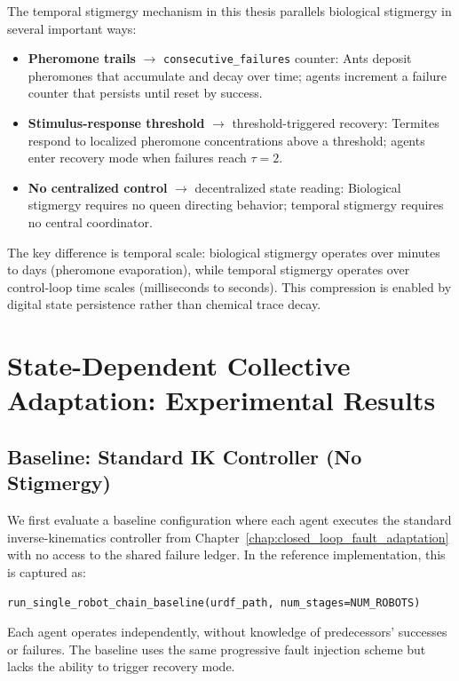 \documentclass[12pt,a4paper,oneside]{report}
\begin{document}
The temporal stigmergy mechanism in this thesis parallels biological stigmergy in several important ways:

\begin{itemize}
    \item \textbf{Pheromone trails} $\rightarrow$ \texttt{consecutive\_failures} counter: Ants deposit pheromones that accumulate and decay over time; agents increment a failure counter that persists until reset by success.
    \item \textbf{Stimulus-response threshold} $\rightarrow$ threshold-triggered recovery: Termites respond to localized pheromone concentrations above a threshold; agents enter recovery mode when failures reach $\tau = 2$.
    \item \textbf{No centralized control} $\rightarrow$ decentralized state reading: Biological stigmergy requires no queen directing behavior; temporal stigmergy requires no central coordinator.
\end{itemize}

The key difference is temporal scale: biological stigmergy operates over minutes to days (pheromone evaporation), while temporal stigmergy operates over control-loop time scales (milliseconds to seconds). This compression is enabled by digital state persistence rather than chemical trace decay.

\section{State-Dependent Collective Adaptation: Experimental Results}

\subsection{Baseline: Standard IK Controller (No Stigmergy)}
\label{subsec:baseline_standard_ik_controller_no_stigmergy}

We first evaluate a baseline configuration where each agent executes the standard inverse-kinematics controller from Chapter~\ref{chap:closed_loop_fault_adaptation} with no access to the shared failure ledger. In the reference implementation, this is captured as:

{\small
\begin{verbatim}
run_single_robot_chain_baseline(urdf_path, num_stages=NUM_ROBOTS)
\end{verbatim}
}

Each agent operates independently, without knowledge of predecessors' successes or failures. The baseline uses the same progressive fault injection scheme but lacks the ability to trigger recovery mode.
\end{document}
